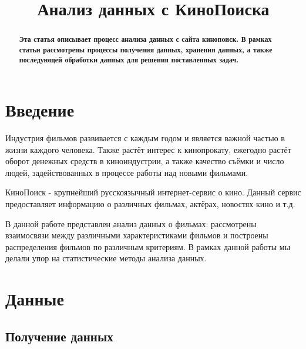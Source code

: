 \documentclass[conference]{IEEEtran}
\begin{document}
\title{Анализ данных с КиноПоиска}

\author{
}

\maketitle
\begin{abstract}
\textbf{Эта статья описывает процесс анализа данных с сайта кинопоиск. В рамках статьи рассмотрены процессы получения данных, хранения данных, а также последующей обработки данных для решения поставленных задач.}
\end{abstract}


\section{Введение}

Индустрия фильмов развивается с каждым годом и является важной частью в жизни каждого человека. Также растёт интерес к кинопрокату, ежегодно растёт оборот денежных средств в киноиндустрии, а также качество съёмки и число людей, задействованных в процессе работы над новыми фильмами.

КиноПоиск - крупнейший русскоязычный интернет-сервис о кино. Данный сервис предоставляет информацию о различных фильмах, актёрах, новостях кино и т.д.

В данной работе представлен анализ данных о фильмах: рассмотрены взаимосвязи между 
различными характеристиками фильмов и построены распределения фильмов по различным критериям. В рамках данной работы мы делали упор на статистические методы анализа данных.

\section{Данные}

\subsection{Получение данных}
\end{document}
